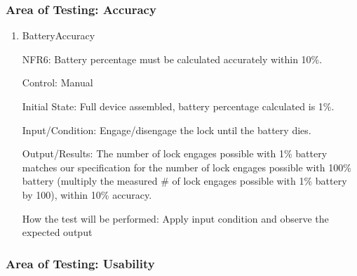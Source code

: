 \documentclass[12pt, titlepage]{article}
\begin{document}
\subsubsection{Area of Testing: Accuracy}

\begin{enumerate}

\item{BatteryAccuracy

NFR6: Battery percentage must be calculated accurately within 10\%. }

Control: Manual

Initial State: Full device assembled, battery percentage calculated is 1\%. 

Input/Condition: Engage/disengage the lock until the battery dies.

Output/Results: The number of lock engages possible with 1\% battery matches our specification for the number of lock engages possible with 100\% battery (multiply the measured \# of lock engages possible with 1\% battery by 100), within 10\% accuracy.

How the test will be performed: Apply input condition and observe the expected output

\end{enumerate}

\subsubsection{Area of Testing: Usability}
\end{document}

